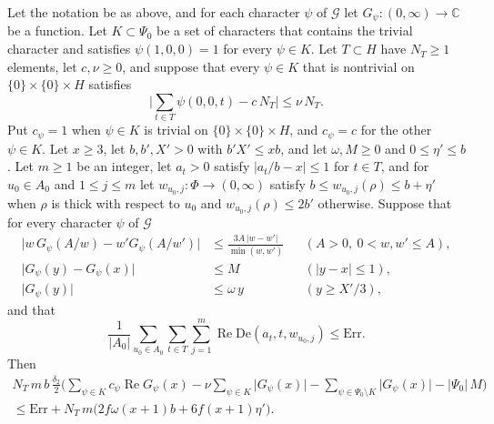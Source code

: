 \begin{theorem}\label{step5}
Let the notation be as above, and for each character $\psi$ of $\mathcal G$ let $G_\psi\colon(0,\infty)\to\mathbb C$ be a function. Let $K\subset\Psi_0$ be a set of characters that contains the trivial character and satisfies $\psi(1,0,0)=1$ for every $\psi\in K$. Let $T\subset H$ have $N_T\ge1$ elements, let $c,\nu\ge0$, and suppose that every $\psi\in K$ that is nontrivial on $\{0\}\times\{0\}\times H$ satisfies
\begin{equation}\label{equi}
\Big\lvert\sum_{t\in T}\psi(0,0,t)-c\,N_T\Big\rvert\le\nu\,N_T .
\end{equation}
Put $c_\psi=1$ when $\psi\in K$ is trivial on $\{0\}\times\{0\}\times H$, and $c_\psi=c$ for the other $\psi\in K$. Let $x\ge3$, let $b,b',X'>0$ with $b'X'\le xb$, and let $\omega,M\ge0$ and $0\le\eta'\le b$. Let $m\ge1$ be an integer, let $a_t>0$ satisfy $\lvert a_t/b-x\rvert\le1$ for $t\in T$, and for $u_0\in A_0$ and $1\le j\le m$ let $w_{u_0,j}\colon\Phi\to(0,\infty)$ satisfy $b\le w_{u_0,j}(\rho)\le b+\eta'$ when $\rho$ is thick with respect to $u_0$ and $w_{u_0,j}(\rho)\le2b'$ otherwise. Suppose that for every character $\psi$ of $\mathcal G$
\begin{align}
\big\lvert w\,G_\psi(A/w)-w'G_\psi(A/w')\big\rvert&\le\frac{3A\,\lvert w-w'\rvert}{\min(w,w')}&&(A>0,\ 0<w,w'\le A),\label{L1}\\
\lvert G_\psi(y)-G_\psi(x)\rvert&\le M&&(\lvert y-x\rvert\le1),\label{L2}\\
\lvert G_\psi(y)\rvert&\le\omega\,y&&(y\ge X'/3),\label{L3}
\end{align}
and that
\[
\frac1{\lvert A_0\rvert}\sum_{u_0\in A_0}\sum_{t\in T}\sum_{j=1}^m\operatorname{Re}\mathrm{De}(a_t,t,w_{u_0,j})\le\mathrm{Err}.
\]
Then
\begin{multline}\label{step5conc}
N_T\,m\,b\,\frac{\delta_2}2\Big(\sum_{\psi\in K}c_\psi\operatorname{Re}G_\psi(x)-\nu\sum_{\psi\in K}\lvert G_\psi(x)\rvert-\sum_{\psi\in\Psi_0\setminus K}\lvert G_\psi(x)\rvert-\lvert\Psi_0\rvert\,M\Big)\\
\le\mathrm{Err}+N_T\,m\Big(2f\omega(x+1)b+6f(x+1)\eta'\Big).
\end{multline}
\end{theorem}

